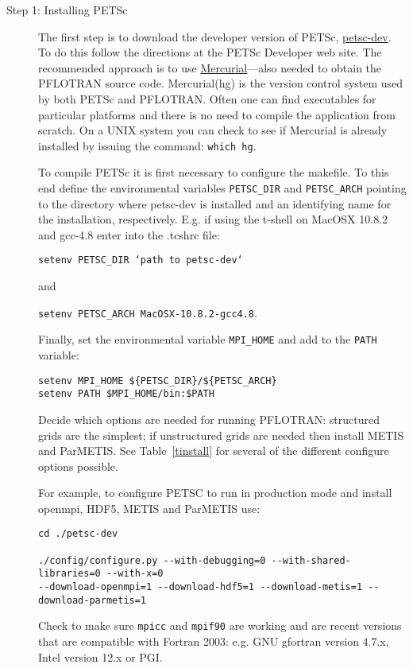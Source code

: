\begin{description}
\item[Step 1: Installing PETSc] The first step is to download the developer version of PETSc, \href{http://www.mcs.anl.gov/petsc/developers/index.html}{petsc-dev}. To do this follow the directions at the PETSc Developer web site. The recommended approach is to use \href{http://mercurial.selenic.com/}{Mercurial}---also needed to obtain the PFLOTRAN source code. Mercurial(hg) is the version control system used by both PETSc and PFLOTRAN. Often one can find executables for particular platforms and there is no need to compile the application from scratch. On a UNIX system you can check to see if Mercurial is already installed by issuing the command: {\footnotesize\tt which hg}.

To compile PETSc it is first necessary to configure the makefile. To this end define the environmental variables {\footnotesize\tt PETSC\_DIR} and {\footnotesize\tt PETSC\_ARCH} pointing to the directory where petsc-dev is installed and an identifying name for the installation, respectively. E.g. if using the t-shell on MacOSX 10.8.2 and gcc-4.8 enter into the .tcshrc file:

{\footnotesize\tt setenv PETSC\_DIR `path to petsc-dev`}

and

{\footnotesize\tt setenv PETSC\_ARCH MacOSX-10.8.2-gcc4.8}.

Finally, set the environmental variable {\footnotesize\tt MPI\_HOME} and add to the {\footnotesize\tt PATH} variable:
\footnotesize
\begin{Verbatim}
setenv MPI_HOME ${PETSC_DIR}/${PETSC_ARCH}
setenv PATH $MPI_HOME/bin:$PATH
\end{Verbatim}
\normalsize
Decide which options are needed for running PFLOTRAN: structured grids are the simplest; if unstructured grids are needed then install METIS and ParMETIS. See Table~\ref{tinstall} for several of the different configure options possible.

For example, to configure PETSC to run in production mode and install openmpi, HDF5, METIS and ParMETIS use:
\footnotesize
\begin{Verbatim}
cd ./petsc-dev

./config/configure.py --with-debugging=0 --with-shared-libraries=0 --with-x=0 
--download-openmpi=1 --download-hdf5=1 --download-metis=1 --download-parmetis=1
\end{Verbatim}
\normalsize

\noindent
Check to make sure {\footnotesize\tt mpicc} and {\footnotesize\tt mpif90} are working and are recent versions that are compatible with Fortran 2003: e.g. GNU gfortran version 4.7.x, Intel version 12.x or PGI.


\end{description}
